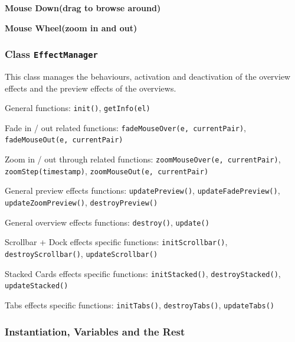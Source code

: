 

\textbf{Mouse Down(drag to browse around)}






\textbf{Mouse Wheel(zoom in and out)}






\subsubsection{Class \texttt{EffectManager}}\label{chap4:effectmanager}

This class manages the behaviours, activation and deactivation of the overview effects and the preview effects of the overviews.

General functions: \texttt{init()}, \texttt{getInfo(el)}

Fade in / out related functions: \texttt{fadeMouseOver(e, currentPair)}, \texttt{fadeMouseOut(e, currentPair)}

Zoom in / out through related functions: \texttt{zoomMouseOver(e, currentPair)}, \texttt{zoomStep(timestamp)}, \texttt{zoomMouseOut(e, currentPair)}

General preview effects functions: \texttt{updatePreview()}, \texttt{updateFadePreview()}, \texttt{updateZoomPreview()}, \texttt{destroyPreview()}

General overview effects functions: \texttt{destroy()}, \texttt{update()}

Scrollbar + Dock effects specific functions: \texttt{initScrollbar()}, \texttt{destroyScrollbar()}, \texttt{updateScrollbar()}

Stacked Cards effects specific functions: \texttt{initStacked()}, \texttt{destroyStacked()}, \texttt{updateStacked()}

Tabs effects specific functions: \texttt{initTabs()}, \texttt{destroyTabs()}, \texttt{updateTabs()}

\subsubsection{Instantiation, Variables and the Rest}

